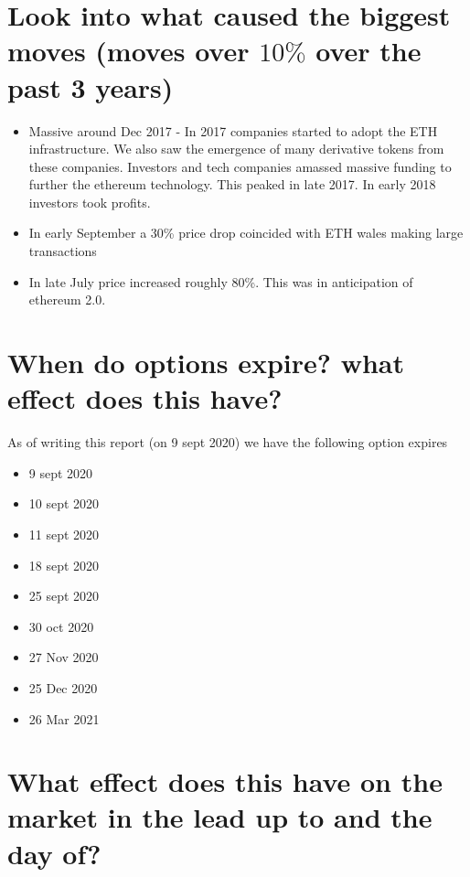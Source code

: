 \section{ Look into what caused the biggest moves (moves over $10 \%$  over the past 3 years)}
\begin{itemize}
\item Massive around Dec 2017 - In 2017 companies started to adopt the ETH infrastructure.  We also saw the emergence of many derivative tokens from these companies. Investors and tech companies amassed massive funding to further the ethereum technology.  This peaked in late 2017. In early 2018 investors took profits.
\item In early September a 30\% price drop coincided with ETH wales making large transactions
\item In late July price increased roughly 80\%.  This was in anticipation of ethereum 2.0.

\end{itemize}
\section{ When do options expire? what effect does this have?}

As of writing this report (on 9 sept 2020) we have the following option expires 

\begin{itemize}
\item 9 sept 2020
\item 10 sept 2020
\item 11 sept 2020
\item 18 sept 2020
\item 25 sept 2020
\item 30 oct 2020
\item 27 Nov 2020
\item 25 Dec 2020
\item 26 Mar 2021
\end{itemize}



\section{ What effect does this have on the market in the lead up to and the day of?}